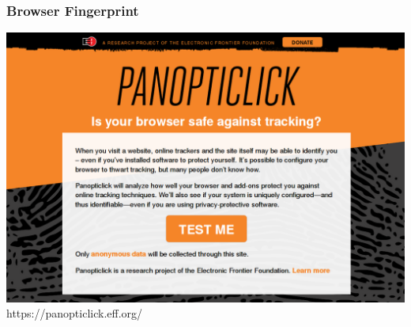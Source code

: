   \begin{frame}
    \frametitle{Browser Fingerprint}
    \includegraphics[height=0.7\textheight]{../../img/browser_fingerprint.png}
    \newline
    https://panopticlick.eff.org/
  \end{frame}

